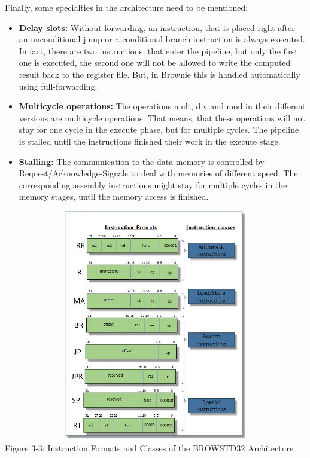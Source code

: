 \documentclass[
]{article}
\begin{document}
Finally, some specialties in the architecture need to be mentioned:

\begin{itemize}
\item
  \textbf{Delay slots:} Without forwarding, an instruction, that is
  placed right after an unconditional jump or a conditional branch
  instruction is always executed. In fact, there are two instructions,
  that enter the pipeline, but only the first one is executed, the
  second one will not be allowed to write the computed result back to
  the register file. But, in Brownie this is handled automatically using
  full-forwarding.
\item
  \textbf{Multicycle operations:} The operations mult, div and mod in
  their different versions are multicycle operations. That means, that
  these operations will not stay for one cycle in the execute phase, but
  for multiple cycles. The pipeline is stalled until the instructions
  finished their work in the execute stage.
\item
  \textbf{Stalling:} The communication to the data memory is controlled
  by Request/Acknowledge-Signals to deal with memories of different
  speed. The corresponding assembly instructions might stay for multiple
  cycles in the memory stages, until the memory access is finished.
\end{itemize}

\includegraphics[width=6.09196in,height=3.97917in]{3-3.png}
\protect\hypertarget{Fig33}{}{}Figure 3‑3: Instruction Formats and
Classes of the BROWSTD32 Architecture
\end{document}

